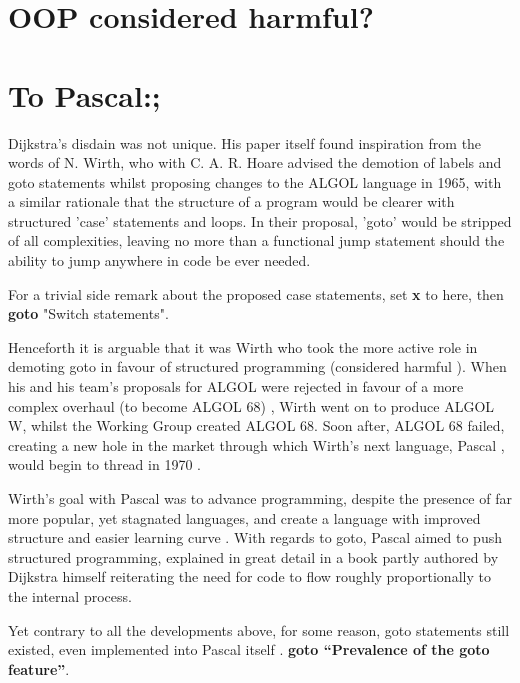\documentclass{journal}
\begin{document}
\section{OOP considered harmful?}

\section{To Pascal:;}
Dijkstra's disdain was not unique. His paper itself found inspiration from the words of N. Wirth, who with C. A. R. Hoare \cite{algolwirth} advised the demotion of labels and goto statements whilst proposing changes to the ALGOL language in 1965, with a similar rationale that the structure of a program would be clearer with structured 'case' statements and loops. In their proposal, 'goto' would be stripped of all complexities, leaving no more than a functional jump statement should the ability to jump anywhere in code be ever needed.

For a trivial side remark about the proposed case statements, set \textbf{x} to here, then \textbf{goto} "Switch statements".

Henceforth it is arguable that it was Wirth who took the more active role in demoting goto in favour of structured programming (considered harmful \cite{harmfulstructure}). When his and his team's proposals for ALGOL were rejected in favour of a more complex overhaul (to become ALGOL 68) \cite{pascalrecollections}, Wirth went on to produce ALGOL W, whilst the Working Group created ALGOL 68. Soon after, ALGOL 68 failed, creating a new hole in the market through which Wirth's next language, Pascal \cite{pascal}, would begin to thread in 1970 \cite{pascalrecollections}.

Wirth's goal with Pascal was to advance programming, despite the presence of far more popular, yet stagnated languages, and create a language with improved structure and easier learning curve \cite{pascal}. With regards to goto, Pascal aimed to push structured programming, explained in great detail in a book partly authored by Dijkstra himself \cite{structured} reiterating the need for code to flow roughly proportionally to the internal process.

Yet contrary to all the developments above, for some reason, goto statements still existed, even implemented into Pascal itself \cite{pascal}. \textbf{goto ``Prevalence of the goto feature''}.
\end{document}
